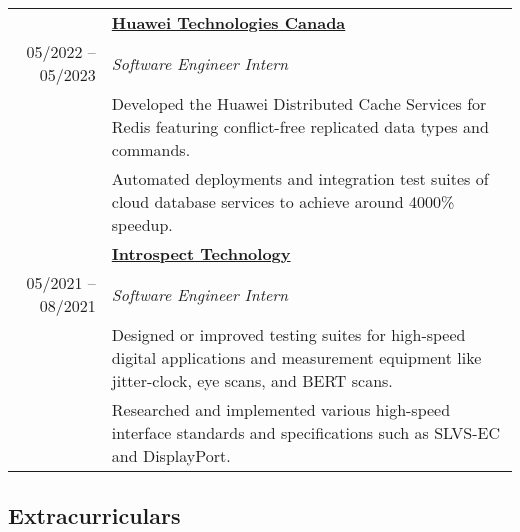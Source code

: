 \documentclass{article}
\begin{document}
\begin{tabularx}{\textwidth}{r X}
		\addlinespace
		& \textbf{\href{https://www.huawei.com/ca/}{Huawei Technologies Canada}} \\*
		05/2022 -- 05/2023 & \textit{Software Engineer Intern} \\*
		& {\small Developed the Huawei Distributed Cache Services for Redis featuring conflict-free replicated data types and commands.} \\*
		& {\small Automated deployments and integration test suites of cloud database services to achieve around 4000\% speedup.} \\
		\addlinespace
		& \textbf{\href{https://introspect.ca/}{Introspect Technology}} \\*
		05/2021 -- 08/2021 & \textit{Software Engineer Intern} \\*
		& {\small Designed or improved testing suites for high-speed digital applications and measurement equipment like jitter-clock, eye scans, and BERT scans.} \\*
		& {\small Researched and implemented various high-speed interface standards and specifications such as SLVS-EC and DisplayPort.} \\*
	\end{tabularx}

	\subsection*{Extracurriculars}
\end{document}
